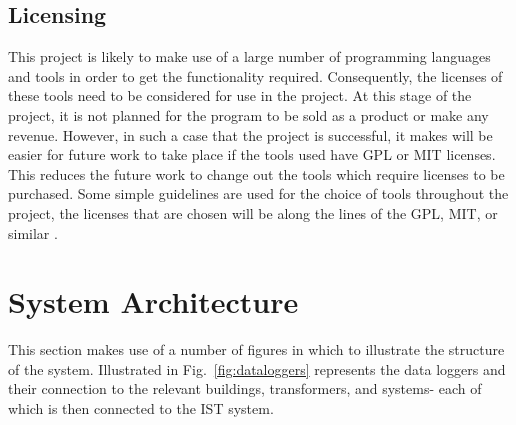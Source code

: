 \documentclass[12pt,onecolumn]{IEEEtran}
\begin{document}
\subsection{Licensing} \label{sec:Licensing}
This project is likely to make use of a large number of programming languages and tools in order to get the functionality required. Consequently, the licenses of these tools need to be considered for use in the project. At this stage of the project, it is not planned for the program to be sold as a product or make any revenue. 
However, in such a case that the project is successful, it makes will be easier for future work to take place if the tools used have GPL or MIT licenses. This reduces the future work to change out the tools which require licenses to be purchased. Some simple guidelines are used for the choice of tools throughout the project, the licenses that are chosen will be along the lines of the GPL, MIT, or similar \cite{yegor}.


\section{System Architecture} \label{sec:SystemArchitecture}

This section makes use of a number of figures in which to illustrate the structure of the system. 
Illustrated in Fig.~\ref{fig:dataloggers} represents the data loggers and their connection to the relevant buildings, transformers, and systems- each of which is then connected to the IST system.
\end{document}
